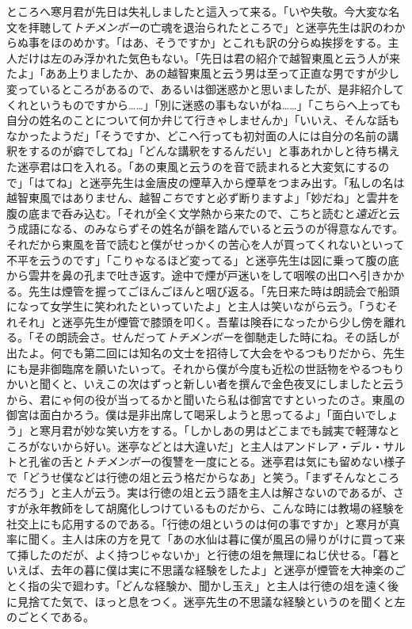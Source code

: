 \documentclass[12pt, openright]{book}
\begin{document}
ところへ寒月君が先日は失礼しましたと這入って来る。「いや失敬。今大変な名文を拝聴して\emph{トチメンボー}の亡魂を退治られたところで」と迷亭先生は訳のわからぬ事をほのめかす。「はあ、そうですか」とこれも訳の分らぬ挨拶をする。主人だけは左のみ浮かれた気色もない。「先日は君の紹介で越智東風と云う人が来たよ」「ああ上りましたか、あの越智東風と云う男は至って正直な男ですが少し変っているところがあるので、あるいは御迷惑かと思いましたが、是非紹介してくれというものですから\ldots{}\ldots{}」「別に迷惑の事もないがね\ldots{}\ldots{}」「こちらへ上っても自分の姓名のことについて何か弁じて行きゃしませんか」「いいえ、そんな話もなかったようだ」「そうですか、どこへ行っても初対面の人には自分の名前の講釈をするのが癖でしてね」「どんな講釈をするんだい」と事あれかしと待ち構えた迷亭君は口を入れる。「あの東風と云うのを音で読まれると大変気にするので」「はてね」と迷亭先生は金唐皮の煙草入から煙草をつまみ出す。「私しの名は越智東風ではありません、越智\emph{こち}ですと必ず断りますよ」「妙だね」と雲井を腹の底まで呑み込む。「それが全く文学熱から来たので、こちと読むと\emph{遠近}と云う成語になる、のみならずその姓名が韻を踏んでいると云うのが得意なんです。それだから東風を音で読むと僕がせっかくの苦心を人が買ってくれないといって不平を云うのです」「こりゃなるほど変ってる」と迷亭先生は図に乗って腹の底から雲井を鼻の孔まで吐き返す。途中で煙が戸迷いをして咽喉の出口へ引きかかる。先生は煙管を握ってごほんごほんと咽び返る。「先日来た時は朗読会で船頭になって女学生に笑われたといっていたよ」と主人は笑いながら云う。「うむそれそれ」と迷亭先生が煙管で膝頭を叩く。吾輩は険呑になったから少し傍を離れる。「その朗読会さ。せんだって\emph{トチメンボー}を御馳走した時にね。その話しが出たよ。何でも第二回には知名の文士を招待して大会をやるつもりだから、先生にも是非御臨席を願いたいって。それから僕が今度も近松の世話物をやるつもりかいと聞くと、いえこの次はずっと新しい者を撰んで金色夜叉にしましたと云うから、君にゃ何の役が当ってるかと聞いたら私は御宮ですといったのさ。東風の御宮は面白かろう。僕は是非出席して喝采しようと思ってるよ」「面白いでしょう」と寒月君が妙な笑い方をする。「しかしあの男はどこまでも誠実で軽薄なところがないから好い。迷亭などとは大違いだ」と主人はアンドレア・デル・サルトと孔雀の舌と\emph{トチメンボー}の復讐を一度にとる。迷亭君は気にも留めない様子で「どうせ僕などは行徳の俎と云う格だからなあ」と笑う。「まずそんなところだろう」と主人が云う。実は行徳の俎と云う語を主人は解さないのであるが、さすが永年教師をして胡魔化しつけているものだから、こんな時には教場の経験を社交上にも応用するのである。「行徳の俎というのは何の事ですか」と寒月が真率に聞く。主人は床の方を見て「あの水仙は暮に僕が風呂の帰りがけに買って来て挿したのだが、よく持つじゃないか」と行徳の俎を無理にねじ伏せる。「暮といえば、去年の暮に僕は実に不思議な経験をしたよ」と迷亭が煙管を大神楽のごとく指の尖で廻わす。「どんな経験か、聞かし玉え」と主人は行徳の俎を遠く後に見捨てた気で、ほっと息をつく。迷亭先生の不思議な経験というのを聞くと左のごとくである。
\end{document}
